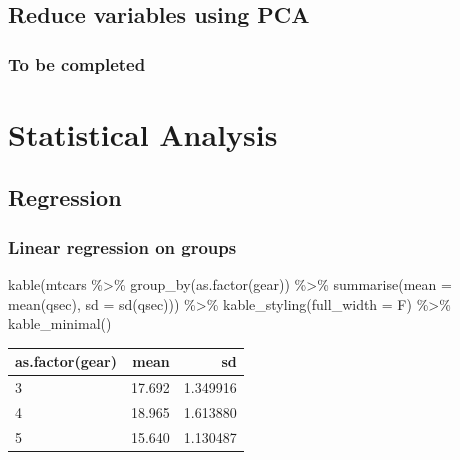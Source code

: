 \documentclass[
]{article}
\newenvironment{Shaded}{\begin{snugshade}}{\end{snugshade}}
\newcommand{\AttributeTok}[1]{\textcolor[rgb]{0.77,0.63,0.00}{#1}}
\newcommand{\FunctionTok}[1]{\textcolor[rgb]{0.00,0.00,0.00}{#1}}
\newcommand{\NormalTok}[1]{#1}
\newcommand{\SpecialCharTok}[1]{\textcolor[rgb]{0.00,0.00,0.00}{#1}}
\begin{document}
\hypertarget{reduce-variables-using-pca}{%
\subsection{Reduce variables using PCA}\label{reduce-variables-using-pca}}

\hypertarget{to-be-completed}{%
\subsubsection{To be completed}\label{to-be-completed}}

\hypertarget{statistical-analysis}{%
\section{Statistical Analysis}\label{statistical-analysis}}

\hypertarget{regression}{%
\subsection{Regression}\label{regression}}

\hypertarget{linear-regression-on-groups}{%
\subsubsection{Linear regression on groups}\label{linear-regression-on-groups}}

\begin{Shaded}
\begin{Highlighting}[]
\FunctionTok{kable}\NormalTok{(mtcars }\SpecialCharTok{\%\textgreater{}\%}  \FunctionTok{group\_by}\NormalTok{(}\FunctionTok{as.factor}\NormalTok{(gear)) }\SpecialCharTok{\%\textgreater{}\%}
\FunctionTok{summarise}\NormalTok{(}\AttributeTok{mean =} \FunctionTok{mean}\NormalTok{(qsec), }\AttributeTok{sd =} \FunctionTok{sd}\NormalTok{(qsec))) }\SpecialCharTok{\%\textgreater{}\%}
  \FunctionTok{kable\_styling}\NormalTok{(}\AttributeTok{full\_width =}\NormalTok{ F) }\SpecialCharTok{\%\textgreater{}\%}
  \FunctionTok{kable\_minimal}\NormalTok{()}
\end{Highlighting}
\end{Shaded}

\begin{table}
\centering
\begin{tabular}{l|r|r}
\hline
as.factor(gear) & mean & sd\\
\hline
3 & 17.692 & 1.349916\\
\hline
4 & 18.965 & 1.613880\\
\hline
5 & 15.640 & 1.130487\\
\hline
\end{tabular}
\end{table}
\end{document}
